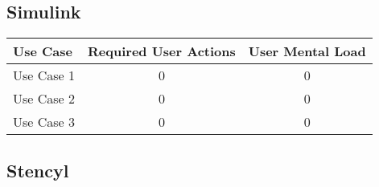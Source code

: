 \subsection*{Simulink}




\begin{tabularx}{\textwidth}{Xcc}
\textbf{Use Case} & \textbf{Required User Actions} & \textbf{User Mental Load}\\
\hline
Use Case 1                          & 0 & 0 \\
Use Case 2                          & 0 & 0 \\
Use Case 3                          & 0 & 0
\end{tabularx}

\subsection*{Stencyl}



